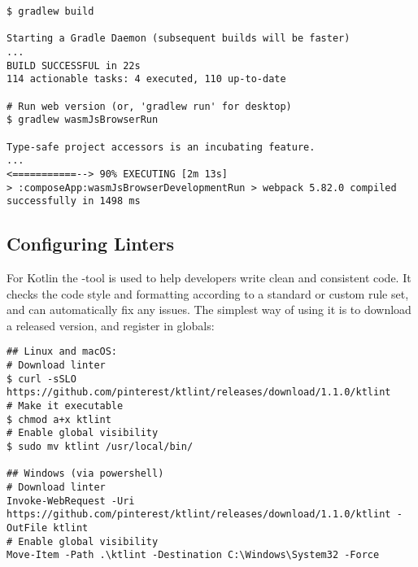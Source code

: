 \begin{lstlisting}[language=terminal]
$ gradlew build

Starting a Gradle Daemon (subsequent builds will be faster)
...
BUILD SUCCESSFUL in 22s
114 actionable tasks: 4 executed, 110 up-to-date

# Run web version (or, 'gradlew run' for desktop)
$ gradlew wasmJsBrowserRun

Type-safe project accessors is an incubating feature.
...
<===========--> 90% EXECUTING [2m 13s]
> :composeApp:wasmJsBrowserDevelopmentRun > webpack 5.82.0 compiled successfully in 1498 ms
\end{lstlisting}



\subsection{Configuring Linters}

For Kotlin the -tool is used to help developers write clean and consistent code. It checks the code style and 
formatting according to a standard or custom rule set, and can automatically fix any issues. The simplest way of using 
it is to download a released version, and register in globals:

\begin{lstlisting}[language=terminal]
## Linux and macOS:
# Download linter
$ curl -sSLO https://github.com/pinterest/ktlint/releases/download/1.1.0/ktlint
# Make it executable
$ chmod a+x ktlint 
# Enable global visibility
$ sudo mv ktlint /usr/local/bin/

## Windows (via powershell)
# Download linter
Invoke-WebRequest -Uri https://github.com/pinterest/ktlint/releases/download/1.1.0/ktlint -OutFile ktlint
# Enable global visibility
Move-Item -Path .\ktlint -Destination C:\Windows\System32 -Force
\end{lstlisting}

